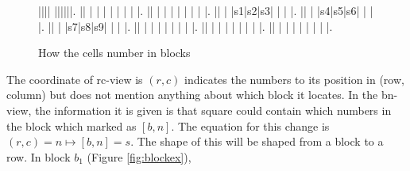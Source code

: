 \documentclass[11pt]{report}
\begin{document}
\begin{figure}[h]
\begin{sudoku}
 |{}|{}|{}| {}|{}|{}|{}|{}|{}|.
 |{}| | | | | | | | |.
 |{}| | | | | | | | |.
 |{}| | |{\LARGE s1}|{\LARGE s2}|{\LARGE s3}| | | |.
 |{}| | |{\LARGE s4}|{\LARGE s5}|{\LARGE s6}| | | |.
 |{}| | |{\LARGE s7}|{\LARGE s8}|{\LARGE s9}| | | |.
 |{}| | | | | | | | |.
 |{}| | | | | | | | |.
 |{}| | | | | | | | |.
\end{sudoku}
\caption{How the cells number in blocks}
\label{fig:squres}
\end{figure}

The coordinate of rc-view is $(r, c)$ indicates the numbers to its position in (row, column) but does not mention anything about which block it locates. In the bn-view, the information it is given is that square could contain which numbers in the block which marked as $[b, n]$. The equation for this change is $(r, c) = n \mapsto [b, n] = s$. The shape of this will be shaped from a block to a row. In block $b_{1}$ (Figure \ref{fig:blockex}), 
\end{document}
